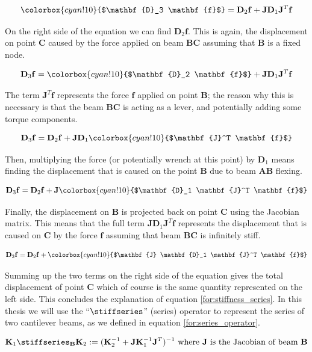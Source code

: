 $$
\colorbox{cyan!10}{$\mathbf{D}_3 \mathbf{f}$} = \mathbf{D}_2 \mathbf{f} + \mathbf{J} \mathbf{D}_1 \mathbf{J}^T \mathbf{f}
$$

\noindent
On the right side of the equation we can find $\mathbf{D}_2 \mathbf{f}$. This is again, the displacement 
on point $\mathbf{C}$ caused by the force applied on beam $\mathbf{BC}$ assuming that $\mathbf{B}$ is
a fixed node.

$$
\mathbf{D}_3 \mathbf{f} = \colorbox{cyan!10}{$\mathbf{D}_2 \mathbf{f}$} + \mathbf{J} \mathbf{D}_1 \mathbf{J}^T \mathbf{f}
$$

\noindent
The term $\mathbf{J}^T\mathbf{f}$ represents the force $\mathbf{f}$ applied on point $\mathbf{B}$; the reason why
this is necessary is that the beam $\mathbf{BC}$ is acting as a lever, and potentially adding some torque components.



$$
\mathbf{D}_3 \mathbf{f} = \mathbf{D}_2 \mathbf{f} + \mathbf{J} \mathbf{D}_1 \colorbox{cyan!10}{$\mathbf{J}^T \mathbf{f}$}
$$

\noindent
Then, multiplying the force (or potentially wrench at this point) by $\mathbf{D}_1$ means finding the displacement that
is caused on the point $\mathbf{B}$ due to beam $\mathbf{AB}$ flexing.

$$
\mathbf{D}_3 \mathbf{f} = \mathbf{D}_2 \mathbf{f} + \mathbf{J} \colorbox{cyan!10}{$\mathbf{D}_1 \mathbf{J}^T \mathbf{f}$}
$$

\noindent
Finally, the displacement on $\mathbf{B}$ is projected back on point $\mathbf{C}$ using the Jacobian matrix.
This means that the full term $\mathbf{J} \mathbf{D}_1 \mathbf{J}^T \mathbf{f}$ represents
the displacement that is caused on $\mathbf{C}$ by the force $\mathbf{f}$ assuming that beam
$\mathbf{BC}$ is infinitely stiff.

$$
\mathbf{D}_3 \mathbf{f} = \mathbf{D}_2 \mathbf{f} + \colorbox{cyan!10}{$\mathbf{J} \mathbf{D}_1 \mathbf{J}^T \mathbf{f}$}
$$

\noindent
Summing up the two terms on the right side of the equation gives the total displacement of point $\mathbf{C}$
which of course is the same quantity represented on the left side. This concludes the explanation of equation \ref{for:stiffness_series}.
In this thesis we will use the ``$\stiffseries$'' (series) operator to represent the series of two cantilever beams, as we defined
in equation \ref{for:series_operator}.


\begin{equation}
\mathbf{K}_1 \stiffseries_{\mathbf{B}} \mathbf{K}_2 := 
(\mathbf{K}_2^{-1} + \mathbf{J} \mathbf{K}_1^{-1} \mathbf{J}^T)^{-1} 
\text{ where $\mathbf{J}$ is the Jacobian of beam $\mathbf{B}$}
\label{for:series_operator}
\end{equation}


